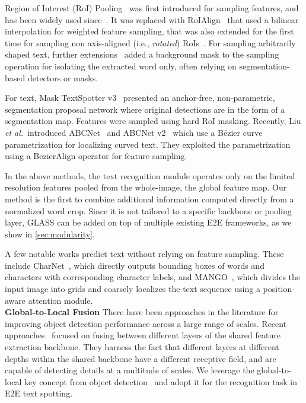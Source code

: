 \documentclass[runningheads]{llncs}
\newcommand{\etal}{\textit{et al.}}
\begin{document}
Region of Interest (RoI) Pooling~\cite{girshick2015fast} was first introduced for sampling features, and has been widely used since~\cite{li2017towards,wang2021towards}.  
It was replaced with RoIAlign~\cite{he2017mask} that used a bilinear interpolation for weighted feature sampling, that was also extended for the first time for sampling non axis-aligned (i.e., \emph{rotated}) RoIs~\cite{liu2018fots}.
For sampling arbitrarily shaped text, further extensions~\cite{lyu2018spotter,krylov2021yamts,liao2020spotterV3} added a background mask to the sampling operation for isolating the extracted word only, often relying on segmentation-based detectors or masks. 

For text, Mask TextSpotter v3~\cite{liao2020spotterV3}  
presented an anchor-free, non-parametric, segmentation proposal network where original detections are in the form of a segmentation map.
Features were sampled using hard RoI masking.
Recently, Liu \etal~introduced ABCNet~\cite{liu2020abcnet} and ABCNet v2~\cite{liu2021abcnetV2} which use a Bézier curve parametrization for localizing curved text. They exploited the parametrization using a BezierAlign operator for feature sampling. 

In the above methods, the text recognition module operates only on the limited resolution features pooled from the whole-image, the global feature map.
Our method is the first to combine additional information computed directly from a normalized word crop.
Since it is not tailored to a specific backbone or pooling layer, GLASS can be added on top of multiple existing E2E frameworks, as we show in \cref{sec:modularity}.

A few notable works predict text without relying on feature sampling.
These include CharNet~\cite{liu2018char}, which directly outputs bounding boxes of words and characters with corresponding character labels, and MANGO~\cite{qiao2020mango}, which divides the input image into grids and coarsely localizes the text sequence using a position-aware attention module.\\

\noindent \textbf{Global-to-Local Fusion}
There have been approaches in the literature for improving object detection performance across a large range of scales.
Recent approaches~\cite{lin2017fpn,effdet2020,hrnet2021} focused on fusing between different layers of the shared feature extraction backbone.
They harness the fact that different layers at different depths within the shared backbone have a different receptive field, and are capable of detecting details at a multitude of scales.
We leverage the global-to-local key concept from object detection~\cite{lin2017fpn,effdet2020} and adopt it for the recognition task in E2E text spotting.\\
\end{document}
